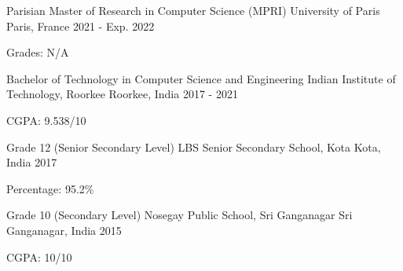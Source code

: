 

\begin{cventries}

  \cventry
    {Parisian Master of Research in Computer Science (MPRI)} %
    {University of Paris} %
    {Paris, France} %
    {2021 - Exp. 2022} %
    {
      \begin{cvitems} %
        \item {Grades: N/A}
      \end{cvitems}
    }

  \cventry
    {Bachelor of Technology in Computer Science and Engineering} %
    {Indian Institute of Technology, Roorkee} %
    {Roorkee, India} %
    {2017 - 2021} %
    {
      \begin{cvitems} %
        \item {CGPA: 9.538/10}
      \end{cvitems}
    }

  \cventry
    {Grade 12 (Senior Secondary Level)} %
    {LBS Senior Secondary School, Kota} %
    {Kota, India} %
    {2017} %
    {
      \begin{cvitems} %
        \item {Percentage: 95.2\%}
      \end{cvitems}
    }

  \cventry
    {Grade 10 (Secondary Level)} %
    {Nosegay Public School, Sri Ganganagar} %
    {Sri Ganganagar, India} %
    {2015} %
    {
      \begin{cvitems} %
        \item {CGPA: 10/10}
      \end{cvitems}
    }

\end{cventries}

